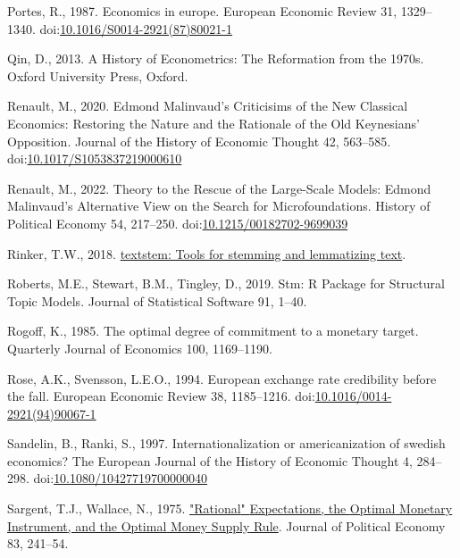 \documentclass[
  12pt,
  onecolumn]{article}
\newlength{\cslhangindent}
\newlength{\cslentryspacingunit} %
\newenvironment{CSLReferences}[2] %
 {%
  \setlength{\parindent}{0pt}
  \ifodd #1
  \let\oldpar\par
  \def\par{\hangindent=\cslhangindent\oldpar}
  \fi
  \setlength{\parskip}{#2\cslentryspacingunit}
 }%
 {}
\begin{document}
\begin{CSLReferences}{1}{0}
\leavevmode{}%
Portes, R., 1987. Economics in europe. European Economic Review 31, 1329--1340. doi:\href{https://doi.org/10.1016/S0014-2921(87)80021-1}{10.1016/S0014-2921(87)80021-1}

\leavevmode{}%
Qin, D., 2013. {A History of Econometrics: The Reformation from the 1970s}. {Oxford University Press}, {Oxford}.

\leavevmode{}%
Renault, M., 2020. Edmond {Malinvaud}'s {Criticisims} of the {New Classical Economics}: {Restoring} the {Nature} and the {Rationale} of the {Old Keynesians}' {Opposition}. Journal of the History of Economic Thought 42, 563--585. doi:\href{https://doi.org/10.1017/S1053837219000610}{10.1017/S1053837219000610}

\leavevmode{}%
Renault, M., 2022. Theory to the {Rescue} of the {Large-Scale Models}: {Edmond Malinvaud}'s {Alternative View} on the {Search} for {Microfoundations}. History of Political Economy 54, 217--250. doi:\href{https://doi.org/10.1215/00182702-9699039}{10.1215/00182702-9699039}

\leavevmode{}%
Rinker, T.W., 2018. \href{http://github.com/trinker/textstem}{{textstem}: Tools for stemming and lemmatizing text}.

\leavevmode{}%
Roberts, M.E., Stewart, B.M., Tingley, D., 2019. Stm: {R Package} for {Structural Topic Models}. Journal of Statistical Software 91, 1--40.

\leavevmode{}%
Rogoff, K., 1985. The optimal degree of commitment to a monetary target. Quarterly Journal of Economics 100, 1169--1190.

\leavevmode{}%
Rose, A.K., Svensson, L.E.O., 1994. European exchange rate credibility before the fall. European Economic Review 38, 1185--1216. doi:\href{https://doi.org/10.1016/0014-2921(94)90067-1}{10.1016/0014-2921(94)90067-1}

\leavevmode{}%
Sandelin, B., Ranki, S., 1997. Internationalization or americanization of swedish economics? The European Journal of the History of Economic Thought 4, 284--298. doi:\href{https://doi.org/10.1080/10427719700000040}{10.1080/10427719700000040}

\leavevmode{}%
Sargent, T.J., Wallace, N., 1975. \href{http://econpapers.repec.org/article/ucpjpolec/v_3A83_3Ay_3A1975_3Ai_3A2_3Ap_3A241-54.htm}{"{Rational}" {Expectations}, the {Optimal} {Monetary} {Instrument}, and the {Optimal} {Money} {Supply} {Rule}}. Journal of Political Economy 83, 241--54.


\end{CSLReferences}
\end{document}

